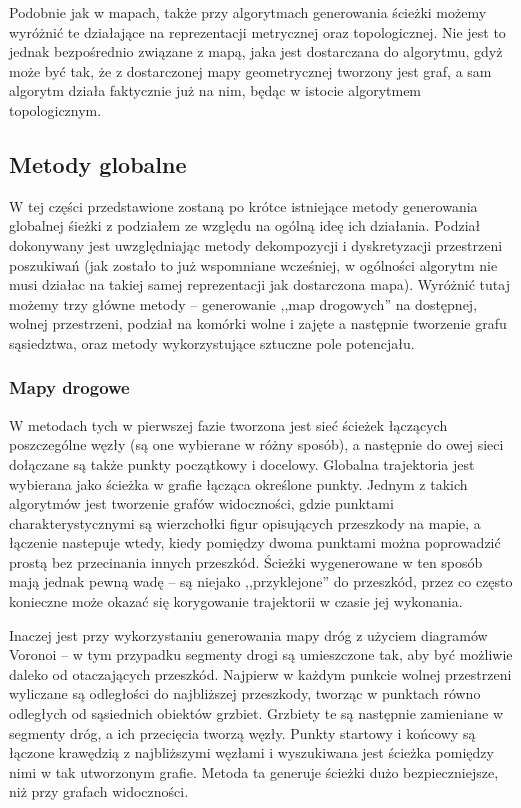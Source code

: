 Podobnie jak w mapach, także przy algorytmach generowania ścieżki możemy wyróżnić
te działające na reprezentacji metrycznej oraz topologicznej. Nie jest to jednak
bezpośrednio związane z mapą, jaka jest dostarczana do algorytmu, gdyż może być tak,
że z dostarczonej mapy geometrycznej tworzony jest graf, a sam algorytm działa faktycznie
już na nim, będąc w istocie algorytmem topologicznym.

\subsection{Metody globalne}

W tej części przedstawione zostaną po krótce istniejące metody generowania globalnej
śieżki z podziałem ze względu na ogólną ideę ich działania. Podział dokonywany
jest uwzględniając metody dekompozycji i dyskretyzacji przestrzeni poszukiwań (jak zostało
to już wspomniane wcześniej, w ogólności algorytm nie musi działac na takiej samej reprezentacji
jak dostarczona mapa). Wyróżnić tutaj możemy trzy główne metody -- generowanie
,,map drogowych'' na dostępnej, wolnej przestrzeni, podział na komórki wolne i zajęte
a następnie tworzenie grafu sąsiedztwa, oraz metody wykorzystujące sztuczne pole potencjału.

\subsubsection{Mapy drogowe}

W metodach tych w pierwszej fazie tworzona jest sieć ścieżek łączących poszczególne
węzły (są one wybierane w różny sposób), a następnie do owej sieci dołączane są
także punkty początkowy i docelowy. Globalna trajektoria jest wybierana jako ścieżka
w grafie łącząca określone punkty. Jednym z takich algorytmów jest tworzenie grafów
widoczności, gdzie punktami charakterystycznymi są wierzchołki figur opisujących
przeszkody na mapie, a łączenie nastepuje wtedy, kiedy pomiędzy dwoma punktami można
poprowadzić prostą bez przecinania innych przeszkód. Ścieżki wygenerowane w ten sposób
mają jednak pewną wadę -- są niejako ,,przyklejone'' do przeszkód, przez co często
konieczne może okazać się korygowanie trajektorii w czasie jej wykonania.

Inaczej jest przy wykorzystaniu generowania mapy dróg z użyciem diagramów Voronoi -- w tym
przypadku segmenty drogi są umieszczone tak, aby być możliwie daleko od otaczających
przeszkód. Najpierw w każdym punkcie wolnej przestrzeni wyliczane są odległości
do najbliższej przeszkody, tworząc w punktach równo odległych od sąsiednich obiektów
grzbiet. Grzbiety te są następnie zamieniane w segmenty dróg, a ich przecięcia tworzą
węzły. Punkty startowy i końcowy są łączone krawędzią z najbliższymi węzłami i wyszukiwana
jest ścieżka pomiędzy nimi w tak utworzonym grafie. Metoda ta generuje ścieżki
dużo bezpieczniejsze, niż przy grafach widoczności.

